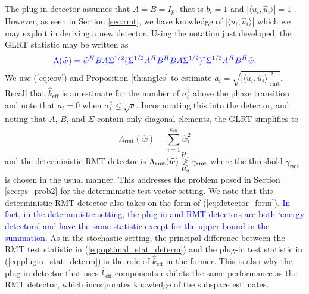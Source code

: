 The plug-in detector assumes that $A=B=I_{\widehat{k}}$, that is $b_i=1$ and $|\langle u_i,\widehat{u}_i\rangle|=1$ . However, as seen in Section \ref{sec:rmt}, we have knowledge of $|\langle u_i,\widehat{u}_i\rangle|$ which we may exploit in deriving a new detector. Using the notation just developed, the GLRT statistic may be written as
\begin{equation*}
\textcolor{blue}{\Lambda(\widehat{w})=\widehat{w}^HBA\Sigma^{1/2}(\Sigma^{1/2}A^HB^HBA\Sigma^{1/2})^{\dagger}\Sigma^{1/2}A^HB^H\widehat{w}.}
\end{equation*}
We use (\ref{eq:cov}) and Proposition \ref{th:angles} to estimate $a_i=\sqrt{|\langle u_i,\widehat{u}_i\rangle|^2_{\text{rmt}}}$. Recall that $\widehat{k}_{\text{eff}}$ is an estimate for the number of $\sigma_i^2$ above the phase transition and note that $a_i=0$ when $\sigma_i^2\leq\sqrt{c}$. Incorporating this into the detector, and noting that $A$, $B$, and $\Sigma$ contain only diagonal elements, the GLRT simplifies to
\begin{equation}\label{eq:optimal_stat_determ}
\boxed{\Lambda_{\text{rmt}}(\widehat{w}) = \sum_{i=1}^{\widehat{k}_{\text{eff}}}\widehat{w}_i^2}
\end{equation}
and the deterministic RMT detector is $\Lambda_{\text{rmt}}(\widehat{w}) \overset{H_1}{\underset{H_0}{\gtrless}} \gamma_{\text{rmt}}$
where the threshold $\gamma_{\text{rmt}}$ is chosen in the usual manner. This addresses the problem posed in Section \ref{sec:ps_prob2} for the deterministic test vector setting.  We note that this deterministic RMT detector also takes on the form of (\ref{eq:detector_form}). \textcolor{blue}{In fact, in the deterministic setting, the plug-in and RMT detectors are both `energy detectors' and have the same statistic except for the upper bound in the summation.} As in the stochastic setting, the principal difference between the RMT test statistic in (\ref{eq:optimal_stat_determ}) and the plug-in test statistic in (\ref{eq:plugin_stat_determ}) is the role of $\widehat{k}_{\text{eff}}$ in the former. This is also why the plug-in detector that uses $\widehat{k}_{\text{eff}}$ components exhibits the same performance as the RMT detector, which incorporates knowledge of the subspace estimates. 
